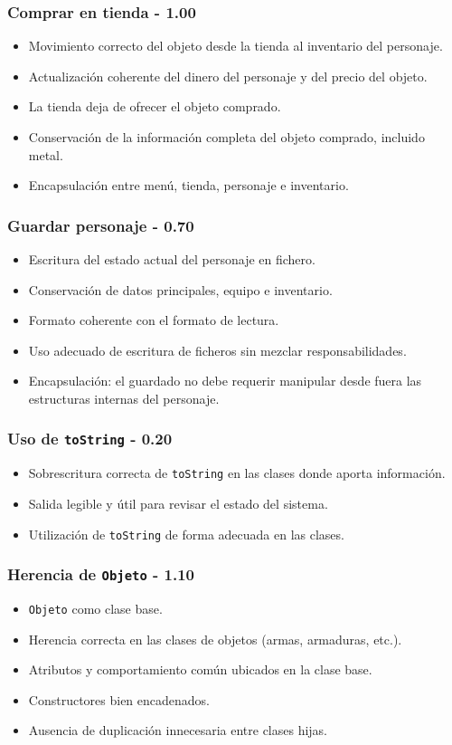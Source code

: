 \documentclass[10pt,a4paper]{article}
\begin{document}
\subsubsection{Comprar en tienda - 1.00}
\begin{itemize}
    \item Movimiento correcto del objeto desde la tienda al inventario del personaje.
    \item Actualización coherente del dinero del personaje y del precio del objeto.
    \item La tienda deja de ofrecer el objeto comprado.
    \item Conservación de la información completa del objeto comprado, incluido metal.
    \item Encapsulación entre menú, tienda, personaje e inventario.
\end{itemize}
\subsubsection{Guardar personaje - 0.70}
\begin{itemize}
    \item Escritura del estado actual del personaje en fichero.
    \item Conservación de datos principales, equipo e inventario.
    \item Formato coherente con el formato de lectura.
    \item Uso adecuado de escritura de ficheros sin mezclar responsabilidades.
    \item Encapsulación: el guardado no debe requerir manipular desde fuera las estructuras internas del personaje.
\end{itemize}
\subsubsection{Uso de \texttt{toString} - 0.20}
\begin{itemize}
    \item Sobrescritura correcta de \texttt{toString} en las clases donde aporta información.
    \item Salida legible y útil para revisar el estado del sistema.
    \item Utilización de \texttt{toString} de forma adecuada en las clases.
\end{itemize}
\subsubsection{Herencia de \texttt{Objeto} - 1.10}
\begin{itemize}
    \item \texttt{Objeto} como clase base.
    \item Herencia correcta en las clases de objetos (armas, armaduras, etc.).
    \item Atributos y comportamiento común ubicados en la clase base.
    \item Constructores bien encadenados.
    \item Ausencia de duplicación innecesaria entre clases hijas.
\end{itemize}
\end{document}
